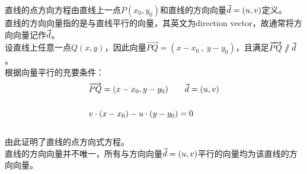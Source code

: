 \documentclass[UTF8]{ctexart}
\let\nvec\vec
\def\vec#1{\nvec{\vphantom b\smash{#1}}}
\renewcommand\parallel{{\hspace{3.0pt}\mathrel{/\mskip-6.5mu/}\hspace{2.6pt}}}
\begin{document}
    直线的点方向方程由直线上一点$P(x_0,y_0)$和直线的方向向量$\vec{d}=(u,v)$定义。\\[3mm]
    直线的方向向量指的是与直线平行的向量，其英文为direction vector，故通常将方向向量记作$\vec{d}$。\\[6mm]
    设直线上任意一点$Q(x,y)$，因此向量$\overrightarrow{PQ}=(x-x_0~,~y-y_0)$，且满足$\overrightarrow{PQ}\parallel\vec{d}$。\\[3mm]
    根据向量平行的充要条件：
    \begin{align}
        &\overrightarrow{PQ}=(x-x_0,y-y_0)~~~~~~\vec{d}=(u,v)\\[5mm]
        &v\cdot(x-x_0)-u\cdot(y-y_0)=0
    \end{align}\\
    由此证明了直线的点方向式方程。\\[3mm]
    直线的方向向量并不唯一，所有与方向向量$\vec{d}=(u,v)$平行的向量均为该直线的方向向量。
    
\newpage
\end{document}
